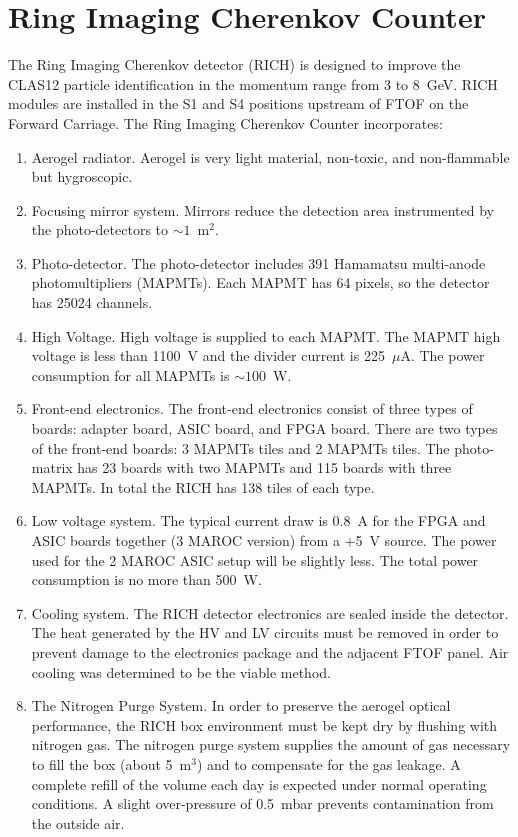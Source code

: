 \section{Ring Imaging Cherenkov Counter}

The Ring Imaging Cherenkov detector (RICH) is designed to improve the CLAS12 particle 
identification in the momentum range from 3 to 8~GeV. RICH modules are installed in the S1
and S4 positions upstream of FTOF on the Forward Carriage. The Ring Imaging Cherenkov Counter
incorporates:

\begin{enumerate}
\item Aerogel radiator. Aerogel is very light material, non-toxic, and non-flammable but 
hygroscopic.

\item Focusing mirror system. Mirrors reduce the detection area instrumented by the 
photo-detectors to $\sim 1$~m$^2$.

\item Photo-detector. The photo-detector includes 391 Hamamatsu multi-anode photomultipliers 
(MAPMTs). Each MAPMT has 64 pixels, so the detector has 25024 channels.

\item High Voltage. High voltage is supplied to each MAPMT. The MAPMT high voltage is less 
than 1100~V and the divider current is 225~$\mu$A. The power consumption for all MAPMTs is 
$\sim 100$~W.

\item Front-end electronics. The front-end electronics consist of three types of boards: adapter 
board, ASIC board, and FPGA board.  There are two types of the front-end boards: 3 MAPMTs tiles 
and 2 MAPMTs tiles. The photo-matrix has 23 boards with two MAPMTs and 115 boards with three MAPMTs. 
In total the RICH has 138 tiles of each type.

\item Low voltage system. The typical current draw is 0.8~A for the FPGA and ASIC boards together 
(3 MAROC version) from a +5~V source. The power used for the 2 MAROC ASIC setup will be slightly 
less. The total power consumption is no more than 500~W. 
 
 \item Cooling system. The RICH detector electronics are sealed inside the detector. The heat 
generated by the HV and LV circuits must be removed in order to prevent damage to the electronics 
package and the adjacent FTOF panel. Air cooling was determined to be the viable method.

\item The Nitrogen Purge System. In order to preserve the aerogel optical performance, the RICH 
box environment must be kept dry by flushing with nitrogen gas. The nitrogen purge system supplies 
the amount of gas necessary to fill the box (about 5~m$^3$) and to compensate for the gas leakage.
A complete refill of the volume each day is expected under normal operating conditions. A slight 
over-pressure of 0.5~mbar prevents contamination from the outside air.

\end{enumerate}

